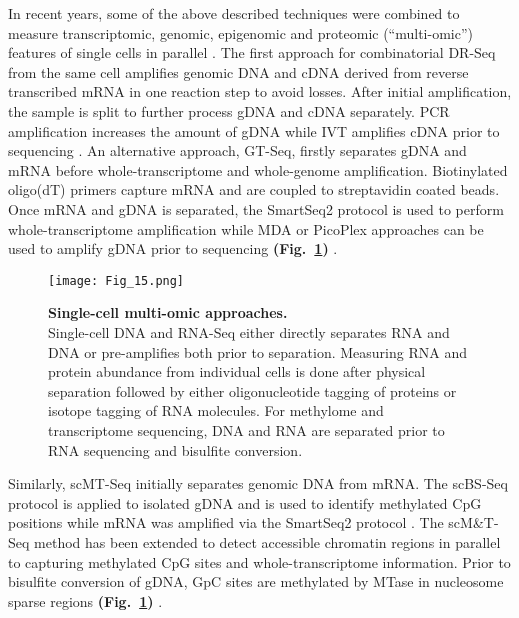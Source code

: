 In recent years, some of the above described techniques were combined to measure transcriptomic, genomic, epigenomic and proteomic (“multi-omic”) features of single cells in parallel \citep{Macaulay2017}. 
The first approach for combinatorial \gls{DR-Seq} from the same cell amplifies genomic DNA and cDNA derived from reverse transcribed mRNA in one reaction step to avoid losses. 
After initial amplification, the sample is split to further process \gls{gDNA} and cDNA separately. 
PCR amplification increases the amount of gDNA while IVT amplifies cDNA prior to sequencing \citep{Dey2015}. 
An alternative approach, \gls{GT-Seq}, firstly separates gDNA and mRNA before whole-transcriptome and whole-genome amplification. 
Biotinylated oligo(dT) primers capture mRNA and are coupled to streptavidin coated beads. 
Once mRNA and gDNA is separated, the SmartSeq2 protocol is used to perform whole-transcriptome amplification while MDA or PicoPlex approaches can be used to amplify gDNA prior to sequencing \textbf{(Fig.~\ref{fig0:multiomics})} \citep{Macaulay2015}.\\

\begin{figure}[!h]
\centering
\texttt{[image: Fig\_15.png]}
\caption[Single-cell multi-omic approaches]{\textbf{Single-cell multi-omic approaches.}\\
Single-cell DNA and RNA-Seq either directly separates RNA and DNA or pre-amplifies both prior to separation. 
Measuring RNA and protein abundance from individual cells is done after physical separation followed by either oligonucleotide tagging of proteins or isotope tagging of RNA molecules. 
For methylome and transcriptome sequencing, DNA and RNA are separated prior to RNA sequencing and bisulfite conversion.}
\label{fig0:multiomics}
\end{figure}

Similarly, \gls{scMT-Seq} initially separates genomic DNA from mRNA. The scBS-Seq protocol is applied to isolated gDNA and is used to identify methylated CpG positions while mRNA was amplified via the SmartSeq2 protocol \citep{Angermueller2016a}. 
The scM\&{}T-Seq method has been extended to detect accessible chromatin regions in parallel to capturing methylated CpG sites and whole-transcriptome information. 
Prior to bisulfite conversion of gDNA, GpC sites are methylated by MTase in nucleosome sparse regions \textbf{(Fig.~\ref{fig0:multiomics})} \citep{Pott2017, Clark2018}.\\
 
